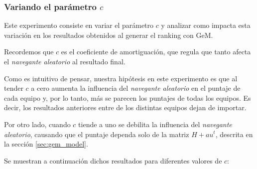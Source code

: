 \subsubsection{Variando el parámetro $c$}\label{exp_gem_2}
Este experimento consiste en variar el parámetro $c$ y analizar como impacta esta
variación en los resultados obtenidos al generar el ranking con GeM.

Recordemos que $c$ es el coeficiente de amortiguación, que regula que tanto afecta
el \textit{navegante aleatorio} al resultado final.

Como es intuitivo de pensar, nuestra hipótesis en este experimento es que al tender
$c$ a cero aumenta la influencia del \textit{navegante aleatorio} en el puntaje de
cada equipo y, por lo tanto, más se parecen los puntajes de todas los equipos.
Es decir, los resultados anteriores entre de los distintas equipos
dejan de importar.

Por otro lado, cuando $c$ tiende a uno se debilita la influencia del \textit{navegante
aleatorio}, causando que el puntaje dependa solo de la matriz $H + au^{t}$, descrita
en la sección \ref{sec:gem_model}.

Se muestran a continuación dichos resultados para diferentes valores de $c$:

